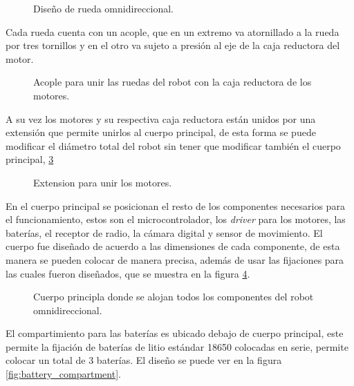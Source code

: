 \documentclass{iccmemoria}
\begin{document}
\begin{figure}[H]
  \centering
  
  \caption{Diseño de rueda omnidireccional.}
  \label{fig:image_omni_whell_2}
\end{figure}

Cada rueda cuenta con un acople, que en un extremo va atornillado a la rueda por tres tornillos y en el otro va sujeto a presión al eje de la caja reductora del motor.\\

\begin{figure}[H]
  \centering
  
  \caption{Acople para unir las ruedas del robot con la caja reductora de los motores.}
  \label{fig:arm}
\end{figure}

A su vez los motores y su respectiva caja reductora están unidos por una extensión que permite unirlos al cuerpo principal, de esta forma se puede modificar el diámetro total del robot sin tener que modificar también el cuerpo principal, \ref{fig:arm}\\

\begin{figure}[H]
  \centering
  
  \caption{Extension para unir los motores.}
  \label{fig:arm}
\end{figure}

En el cuerpo principal se posicionan el resto de los componentes necesarios para el funcionamiento, estos son el microcontrolador, los \emph{driver} para los motores, las baterías, el receptor de radio, la cámara digital y sensor de movimiento. El cuerpo fue diseñado de acuerdo a las dimensiones de cada componente, de esta manera se pueden colocar de manera precisa, además de usar las fijaciones para las cuales fueron diseñados, que se muestra en la figura \ref{fig:frame}.\\

\begin{figure}[H]
  \centering
  
  \caption{Cuerpo principla donde se alojan todos los componentes del robot omnidireccional.}
  \label{fig:frame}
\end{figure}

El compartimiento para las baterías es ubicado debajo de cuerpo principal, este permite la fijación de baterías de litio estándar 18650 colocadas en serie, permite colocar un total de 3 baterías. El diseño se puede ver en la figura \ref{fig:battery_compartment}.
\end{document}
